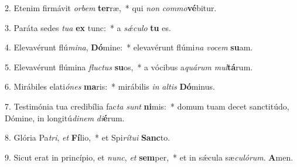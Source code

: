 2. Etenim firmávit \textit{or}\textit{bem} \textbf{ter}ræ,~*  qui \textit{non} \textit{com}\textit{mo}\textbf{vé}bitur.\

3. Paráta sedes \textit{tu}\textit{a} \textbf{ex} tunc:~*  a \textit{sǽ}\textit{cu}\textit{lo} \textbf{tu} es.\

4. Elevavérunt flú\textit{mi}\textit{na}, \textbf{Dó}mine:~*  elevavérunt flúmi\textit{na} \textit{vo}\textit{cem} \textbf{su}am.\

5. Elevavérunt flúmina \textit{fluc}\textit{tus} \textbf{su}os,~*  a vócibus a\textit{quá}\textit{rum} \textit{mul}\textbf{tá}rum.\

6. Mirábiles elati\textit{ó}\textit{nes} \textbf{ma}ris:~*  mirábilis \textit{in} \textit{al}\textit{tis} \textbf{Dó}minus.\

7. Testimónia tua credibília fac\textit{ta} \textit{sunt} \textbf{ni}mis:~*  domum tuam decet sanctitúdo, Dómine, in longitú\textit{di}\textit{nem} \textit{di}\textbf{é}rum.\

8. Glória Pa\textit{tri}, \textit{et} \textbf{Fí}lio,~*  et Spi\textit{rí}\textit{tu}\textit{i} \textbf{Sanc}to.\

9. Sicut erat in princípio, et \textit{nunc}, \textit{et} \textbf{sem}per,~*  et in sǽcula sæ\textit{cu}\textit{ló}\textit{rum}. \textbf{A}men.\

